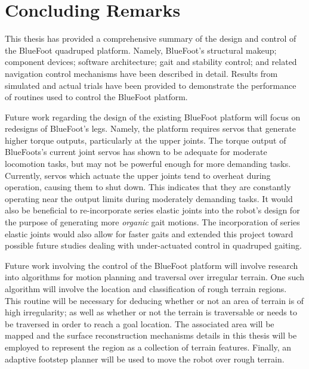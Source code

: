 \chapter{Concluding Remarks}


This thesis has provided a comprehensive summary of the design and control of the BlueFoot quadruped platform. Namely, BlueFoot's structural makeup; component devices; software architecture; gait and stability control; and related navigation control mechanisms have been described in detail. Results from simulated and actual trials have been provided to demonstrate the performance of routines used to control the BlueFoot platform.


Future work regarding the design of the existing BlueFoot platform will focus on redesigns of BlueFoot's legs. Namely, the platform requires servos that generate higher torque outputs, particularly at the upper joints. The torque output of BlueFoots's current joint servos has shown to be adequate for moderate locomotion tasks, but may not be powerful enough for more demanding tasks. Currently, servos which actuate the upper joints tend to overheat during operation, causing them to shut down. This indicates that they are constantly operating near the output limits during moderately demanding tasks. It would also be beneficial to re-incorporate series elastic joints into the robot's design for the purpose of generating more \emph{organic} gait motions. The incorporation of series elastic joints would also allow for faster gaits and extended this project toward possible future studies dealing with under-actuated control in quadruped gaiting.


Future work involving the control of the BlueFoot platform will involve research into algorithms for motion planning and traversal over irregular terrain.  One such algorithm will involve the location and classification of rough terrain regions. This routine will be necessary for deducing whether or not an area of terrain is of high irregularity; as well as whether or not the terrain is traversable or needs to be traversed in order to reach a goal location. The associated area will be mapped and the surface reconstruction mechanisms details in this thesis will be employed to represent the region as a collection of terrain features. Finally, an adaptive footstep planner will be used to move the robot over rough terrain. 


